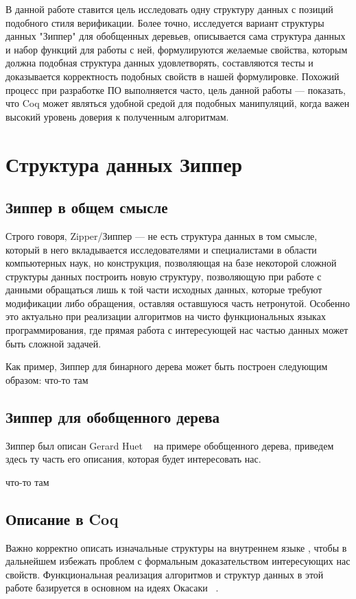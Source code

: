 В данной работе ставится цель исследовать одну структуру данных с позиций подобного стиля верификации. Более точно, исследуется вариант структуры данных "Зиппер" для обобщенных деревьев, описывается сама структура данных и набор функций для работы с ней, формулируются желаемые свойства, которым должна подобная структура данных удовлетворять, составляются тесты и доказывается корректность подобных свойств в нашей формулировке. Похожий процесс при разработке ПО выполняется часто, цель данной работы --- показать, что Coq может являться удобной средой для подобных манипуляций, когда важен высокий уровень доверия к полученным алгоритмам.

\section{Структура данных Зиппер}

\subsection{Зиппер в общем смысле}
Строго говоря, Zipper/Зиппер --- не есть структура данных в том смысле, который в него вкладывается исследователями и специалистами в области компьютерных наук, но конструкция, позволяющая на базе некоторой сложной структуры данных построить новую структуру, позволяющую при работе с данными обращаться лишь к той части исходных данных, которые требуют модификации либо обращения, оставляя оставшуюся часть нетронутой. Особенно это актуально при реализации алгоритмов на чисто функциональных языках программирования, где прямая работа с интересующей нас частью данных может быть сложной задачей. 

Как пример, Зиппер для бинарного дерева может быть построен следующим образом: что-то там

\subsection{Зиппер для обобщенного дерева}

Зиппер был описан Gerard Huet ~\autocite{Huet1997} на примере обобщенного дерева, приведем здесь ту часть его описания, которая будет интересовать нас.

что-то там

\subsection{Описание в Coq}

Важно корректно описать изначальные структуры на внутреннем языке \tcoq, чтобы в дальнейшем избежать проблем с формальным доказательством интересующих нас свойств. Функциональная реализация алгоритмов и структур данных в этой работе базируется в основном на идеях Окасаки ~\autocite{Okasaki1996}.

